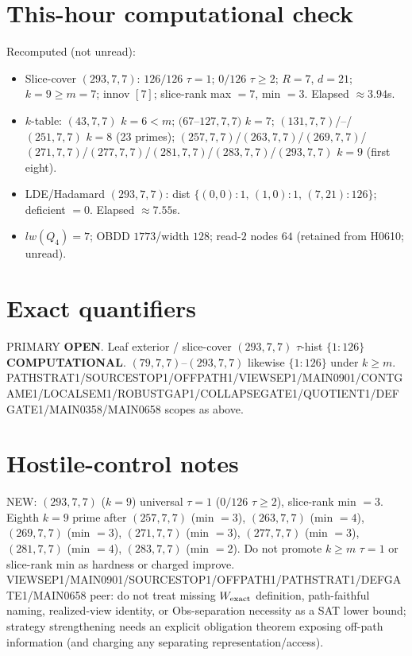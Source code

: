 \documentclass[11pt]{article}
\begin{document}
\section*{This-hour computational check}
Recomputed (not unread):
\begin{itemize}
\item Slice-cover $(293,7,7)$: $126/126$ $\tau{=}1$; $0/126$ $\tau{\ge}2$; $R{=}7$, $d{=}21$;
  $k{=}9{\ge}m{=}7$; innov $[7]$; slice-rank max $=7$, min $=3$. Elapsed $\approx3.94$s.
\item $k$-table: $(43,7,7)$ $k{=}6{<}m$; $(67$--$127,7,7)$ $k{=}7$;
  $(131,7,7)$/--/$(251,7,7)$ $k{=}8$ (23 primes); $(257,7,7)$/$(263,7,7)$/$(269,7,7)$/$(271,7,7)$/$(277,7,7)$/$(281,7,7)$/$(283,7,7)$/$(293,7,7)$ $k{=}9$ (first eight).
\item LDE/Hadamard $(293,7,7)$: dist $\{(0,0){:}1,\,(1,0){:}1,\,(7,21){:}126\}$; deficient $=0$. Elapsed $\approx7.55$s.
\item $lw(Q_4)=7$; OBDD $1773$/width $128$; read-$2$ nodes $64$ (retained from H0610; unread).
\end{itemize}

\section*{Exact quantifiers}
PRIMARY \textbf{OPEN}. Leaf exterior / slice-cover $(293,7,7)$ $\tau$-hist $\{1{:}126\}$ \textbf{COMPUTATIONAL}.
$(79,7,7)$--$(293,7,7)$ likewise $\{1{:}126\}$ under $k{\ge}m$.
PATHSTRAT1/SOURCESTOP1/OFFPATH1/VIEWSEP1/MAIN0901/CONTGAME1/LOCALSEM1/ROBUSTGAP1/COLLAPSEGATE1/QUOTIENT1/DEFGATE1/MAIN0358/MAIN0658 scopes as above.

\section*{Hostile-control notes}
NEW: $(293,7,7)$ ($k{=}9$) universal $\tau{=}1$ ($0/126$ $\tau{\ge}2$), slice-rank min $=3$.
Eighth $k{=}9$ prime after $(257,7,7)$ (min $=3$), $(263,7,7)$ (min $=4$), $(269,7,7)$ (min $=3$), $(271,7,7)$ (min $=3$), $(277,7,7)$ (min $=3$), $(281,7,7)$ (min $=4$), $(283,7,7)$ (min $=2$).
Do not promote $k{\ge}m$ $\tau{=}1$ or slice-rank min as hardness or charged improve.
VIEWSEP1/MAIN0901/SOURCESTOP1/OFFPATH1/PATHSTRAT1/DEFGATE1/MAIN0658 peer: do not treat missing $W_{\rm exact}$ definition,
path-faithful naming, realized-view identity, or Obs-separation necessity as a SAT lower bound;
strategy strengthening needs an explicit obligation theorem exposing off-path information
(and charging any separating representation/access).
\end{document}
